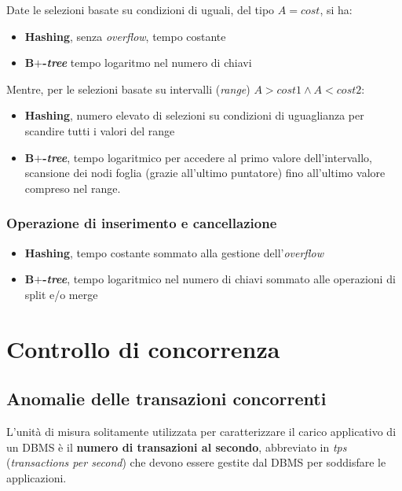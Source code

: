 \documentclass[a4paper]{article}
\begin{document}
	Date le selezioni basate su condizioni di uguali, del tipo $A = cost$, si ha:
	\begin{itemize}
		\item \textbf{Hashing}, senza \emph{overflow}, tempo costante
		\item \textbf{B$\boldsymbol{+}$-\emph{tree}} tempo logaritmo nel numero di chiavi
	\end{itemize}
	Mentre, per le selezioni basate su intervalli (\emph{range}) $A > cost1 \land A < cost2$:
	\begin{itemize}
		\item \textbf{Hashing}, numero elevato di selezioni su condizioni di uguaglianza per scandire tutti i valori del range
		\item \textbf{B$\boldsymbol{+}$-\emph{tree}}, tempo logaritmico per accedere al primo valore dell'intervallo, scansione dei nodi foglia (grazie all'ultimo puntatore) fino all'ultimo valore compreso nel range.
	\end{itemize}

	\subsubsection[Operazione di inserimento e cancellazione]{\textcolor{Red3}{Operazione di inserimento e cancellazione}}
	
	\begin{itemize}
		\item \textbf{Hashing}, tempo costante sommato alla gestione dell'\emph{overflow}
		\item \textbf{B$\boldsymbol{+}$-\emph{tree}}, tempo logaritmico nel numero di chiavi sommato alle operazioni di split e/o merge
	\end{itemize}\newpage

	\section{Controllo di concorrenza}
	
	\subsection{Anomalie delle transazioni concorrenti}\label{anomalie delle transazioni concorrenti}
	
	L'unità di misura solitamente utilizzata per caratterizzare il carico applicativo di un DBMS è il \textbf{numero di transazioni al secondo}, abbreviato in \emph{tps} (\emph{transactions per second}) che devono essere gestite dal DBMS per soddisfare le applicazioni.
	
\end{document}

